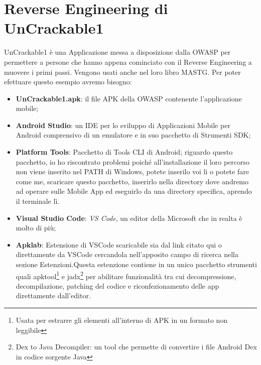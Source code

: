 \documentclass{article}
\begin{document}
\section{Reverse Engineering di UnCrackable1}
UnCrackable1\cite{uncrackable1} è una Applicazione messa a disposizione dalla OWASP per permettere a persone che hanno appena cominciato con 
il Reverse Engineering a muovere i primi passi. Vengono usati anche nel loro libro MASTG\cite{MASTG}.
Per poter efettuare questo esempio avremo bisogno:
\begin{itemize}
    \item \textbf{UnCrackable1.apk}: il file APK della OWASP contenente l'applicazione mobile;
    \item \textbf{Android Studio}\cite{androidStudio}: un IDE per lo sviluppo di Applicazioni Mobile per
    Android comprensivo di un emulatore e in suo pacchetto di Strumenti SDK;
    \item \textbf{Platform Tools}\cite{sdk}: Pacchetto di Tools CLI di Android; riguardo questo
    pacchetto, io ho riscontrato problemi poiché all’installazione il loro percorso non viene inserito nel PATH di Windows, potete inserilo voi li
    o potete fare come me, scaricare questo pacchetto, inserirlo nella directory dove andremo ad operare sulle Mobile App ed eseguirlo da una
    directory specifica, aprendo il terminale lì.
    \item \textbf{Visual Studio Code}\cite{vscode}: \textit{VS Code}, un editor della Microsoft che in realta è molto di più;
    \item \textbf{Apklab}\cite{apklab}: Estensione di VSCode scaricabile sia dal link citato qui\cite{apklab} o direttamente da VSCode cercandola nell'apposito 
    campo di ricerca nella sezione Estenzioni.Questa estenzione contiene in un unico pacchetto strumenti quali apktool\footnote{Usata per estrarre gli elementi all'interno 
    di APK in un formato non leggibile} e jadx\footnote{Dex to Java Decompiler: un tool che permette di convertire i file Android Dex 
    in codice sorgente Java\cite{jadx}} per abilitare funzionalità tra cui
    decompressione, decompilazione, patching del codice e riconfezionamento delle app direttamente dall'editor.
\end{itemize}
\end{document}

